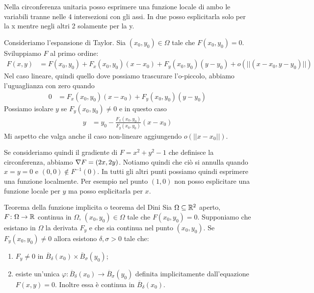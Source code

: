 \documentclass[a4paper]{article}
\begin{document}
\begin{radioactive}
Nella circonferenza unitaria posso esprimere una funzione locale di ambo le variabili
tranne nelle 4 intersezioni con gli assi.
In due posso esplicitarla solo per la x mentre negli altri 2 solamente per la y.

Consideriamo l'espansione di Taylor.
Sia \((x_0, y_0) \in \Omega\) tale che \(F(x_0, y_0) = 0\).
Sviluppiamo \(F\) al primo ordine:
\begin{align*}
    F(x,y) &= F(x_0, y_0) + F_x(x_0, y_0)(x-x_0)
    + F_y(x_0, y_0)(y-y_0) + o(||(x-x_0, y-y_0)||)
\end{align*}
Nel caso lineare, quindi quello dove possiamo trascurare l'o-piccolo,
abbiamo l'uguaglianza con zero quando
\begin{align*}
    0 &= 
    F_x(x_0, y_0)(x-x_0)
    + F_y(x_0, y_0)(y-y_0)
\end{align*}
Possiamo isolare \(y\) se \(F_y(x_0, y_0) \neq 0\)
e in questo caso
\begin{align*}
    y &= y_0 - \frac{F_x(x_0, y_0)}{F_y(x_0, y_0)}(x-x_0)
\end{align*}
Mi aspetto che valga anche il caso non-lineare aggiungendo \(o(||x-x_0||)\).

Se consideriamo quindi il gradiente di \(F = x^2 + y^2 - 1\)
che definisce la circonferenza, abbiamo \(\nabla F = (2x, 2y)\).
Notiamo quindi che ciò si annulla quando \(x=y=0\)
e \((0,0) \notin F^{-1}(0)\). In tutti gli altri punti possiamo quindi esprimere una
funzione localmente.
Per esempio nel punto \((1,0)\) non posso esplicitare una funzione locale
per \(y\) ma posso esplicitarla per \(x\).
\end{radioactive}

\begin{radioactive}
\begin{snippettheorem}{Teorema della funzione implicita o teorema del Dini}
    Sia \(\Omega \subseteq \mathbb{R}^2\) aperto,
    \(F \colon \Omega \to \mathbb{R}\) continua in \(\Omega\),
    \((x_0,y_0) \in \Omega\) tale che \(F(x_0, y_0) = 0\).
    Supponiamo che esistano in \(\Omega\) la derivata \(F_y\)
    e che sia continua nel punto \((x_0, y_0)\).
    Se \(F_y(x_0, y_0) \neq 0\) allora esistono \(\delta, \sigma > 0\)
    tale che:
    \begin{enumerate}
        \item \(F_y \neq 0\) in \(\overline{B}_\delta(x_0) \times \overline{B}_\sigma(y_0)\);
        \item esiste un'unica \(\varphi \colon \overline{B}_\delta(x_0) \to \overline{B}_\sigma(y_0)\)
        definita implicitamente dall'equazione \(F(x,y) = 0\).
        Inoltre essa è continua in \(\overline{B}_\delta(x_0)\).
    \end{enumerate}
\end{snippettheorem}
\end{radioactive}
\end{document}
